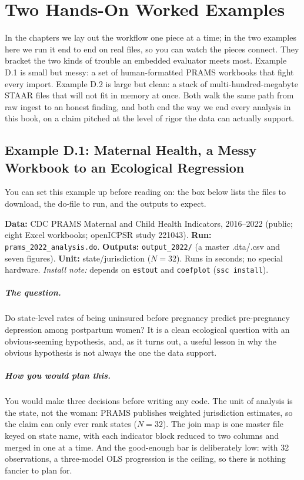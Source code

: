 \documentclass[
    a4paper,
    fontsize=10pt,
    twoside=true,
    numbers=noenddot,
]{kaobook}
\providecommand{\Option}[1]{\textsf{#1}}
\begin{document}
\chapter{Two Hands-On Worked Examples}\label{app:walkthroughs}

In the chapters we lay out the workflow one piece at a time; in the two examples here we run it end to end on real files, so you can watch the pieces connect. They bracket the two kinds of trouble an embedded evaluator meets most. Example D.1 is small but messy: a set of human-formatted PRAMS workbooks that fight every import. Example D.2 is large but clean: a stack of multi-hundred-megabyte STAAR files that will not fit in memory at once. Both walk the same path from raw ingest to an honest finding, and both end the way we end every analysis in this book, on a claim pitched at the level of rigor the data can actually support.

\section*{Example D.1: Maternal Health, a Messy Workbook to an Ecological Regression}
You can set this example up before reading on: the box below lists the files to download, the do-file to run, and the outputs to expect.
\begin{kaobox}[frametitle=Get the files: \texttt{221043-V2/}]
\textbf{Data:} CDC PRAMS Maternal and Child Health Indicators, 2016--2022 (public; eight Excel workbooks; openICPSR study 221043).
\textbf{Run:} \texttt{prams\_2022\_analysis.do}. \textbf{Outputs:} \texttt{output\_2022/} (a master \Option{.dta}/\Option{.csv} and seven figures).
\textbf{Unit:} state/jurisdiction ($N=32$). Runs in seconds; no special hardware. \emph{Install note:} depends on \texttt{estout} and \texttt{coefplot} (\texttt{ssc install}).
\end{kaobox}

\paragraph{The question.} Do state-level rates of being uninsured before pregnancy predict pre-pregnancy depression among postpartum women? It is a clean ecological question with an obvious-seeming hypothesis, and, as it turns out, a useful lesson in why the obvious hypothesis is not always the one the data support.

\paragraph{How you would plan this.} You would make three decisions before writing any code. The unit of analysis is the state, not the woman: PRAMS publishes weighted jurisdiction estimates, so the claim can only ever rank states ($N=32$). The join map is one master file keyed on state name, with each indicator block reduced to two columns and merged in one at a time. And the good-enough bar is deliberately low: with 32 observations, a three-model OLS progression is the ceiling, so there is nothing fancier to plan for.
\end{document}
